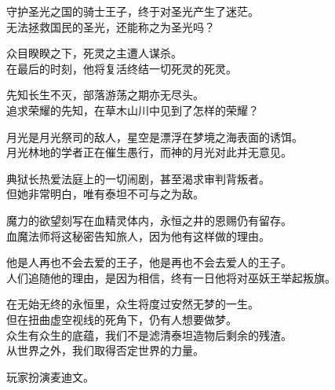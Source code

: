 守护圣光之国的骑士王子，终于对圣光产生了迷茫。\\
无法拯救国民的圣光，还能称之为圣光吗？

众目睽睽之下，死灵之主遭人谋杀。\\
在最后的时刻，他将复活终结一切死灵的死灵。

先知长生不灭，部落游荡之期亦无尽头。\\
追求荣耀的先知，在草木山川中见到了怎样的荣耀？

月光是月光祭司的敌人，星空是漂浮在梦境之海表面的诱饵。\\
月光林地的学者正在催生愚行，而神的月光对此并无意见。

典狱长热爱法庭上的一切闹剧，甚至渴求审判背叛者。\\
但她非常明白，唯有泰坦不可与之为敌。

魔力的欲望刻写在血精灵体内，永恒之井的恩赐仍有留存。\\
血魔法师将这秘密告知旅人，因为他有这样做的理由。

他是人再也不会去爱的王子，他是再也不会去爱人的王子。\\
人们追随他的理由，是因为相信，终有一日他将对巫妖王举起叛旗。

在无始无终的永恒里，众生将度过安然无梦的一生。\\
但在扭曲虚空视线的死角下，仍有人想要做梦。\\
众生有众生的底蕴，我们不是滤清泰坦造物后剩余的残渣。\\
从世界之外，我们取得否定世界的力量。













\clearpage{} %


玩家扮演麦迪文。

